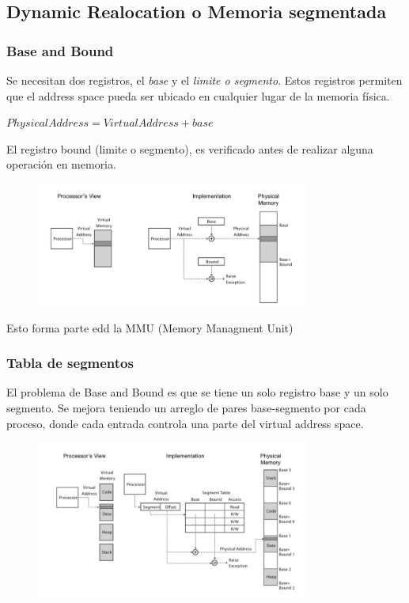 \documentclass[titlepage,a4paper]{article}
\begin{document}
\subsection*{Dynamic Realocation o Memoria segmentada}
\subsubsection*{Base and Bound}
Se necesitan dos registros, el \textit{base} y el \textit{limite o segmento}. Estos registros permiten que el address space pueda ser ubicado en cualquier lugar de la memoria física.

\begin{math}
PhysicalAddress = VirtualAddress + base
\end{math}

El registro bound (limite o segmento), es verificado antes de realizar alguna operación en memoria.

\begin{figure}[!htb]
    \centering
    \includegraphics[width=0.8\textwidth]{ImagenesApunte/base_bound.jpg}
\end{figure}

Esto forma parte edd la MMU (Memory Managment Unit)

\subsubsection*{Tabla de segmentos}
El problema de Base and Bound es que se tiene un solo registro base y un solo segmento. Se mejora teniendo un arreglo de pares base-segmento por cada proceso,  donde cada entrada controla una parte del virtual address space.

\begin{figure}[!htb]
    \centering
    \includegraphics[width=0.8\textwidth]{ImagenesApunte/segment_table.jpg}
\end{figure}
\end{document}
